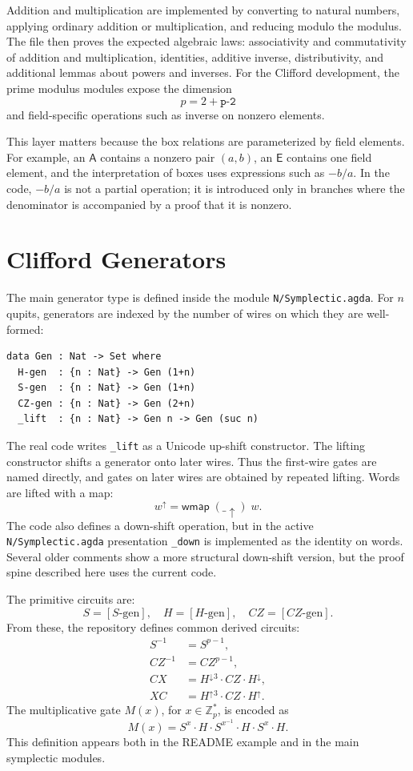 \documentclass[sigplan,screen,review,anonymous]{acmart}
\newcommand{\Zp}{\mathbb{Z}_p}
\newcommand{\ABox}{\mathsf{A}}
\newcommand{\EBox}{\mathsf{E}}
\newcommand{\file}[1]{\texttt{#1}}
\begin{document}
Addition and multiplication are implemented by converting to natural
numbers, applying ordinary addition or multiplication, and reducing
modulo the modulus.  The file then proves the expected algebraic laws:
associativity and commutativity of addition and multiplication,
identities, additive inverse, distributivity, and additional lemmas
about powers and inverses.  For the Clifford development, the prime
modulus modules expose the dimension
\[
  p = 2 + \texttt{p-2}
\]
and field-specific operations such as inverse on nonzero elements.

This layer matters because the box relations are parameterized by
field elements.  For example, an \(\ABox\) contains a nonzero pair
\((a,b)\), an \(\EBox\) contains one field element, and the
interpretation of boxes uses expressions such as \(-b/a\).  In the
code, \(-b/a\) is not a partial operation; it is introduced only in
branches where the denominator is accompanied by a proof that it is
nonzero.

\section{Clifford Generators}

The main generator type is defined inside the module
\file{N/Symplectic.agda}.  For \(n\) qupits, generators are indexed by
the number of wires on which they are well-formed:

\begin{lstlisting}
data Gen : Nat -> Set where
  H-gen  : {n : Nat} -> Gen (1+n)
  S-gen  : {n : Nat} -> Gen (1+n)
  CZ-gen : {n : Nat} -> Gen (2+n)
  _lift  : {n : Nat} -> Gen n -> Gen (suc n)
\end{lstlisting}

The real code writes \texttt{\_lift} as a Unicode up-shift
constructor.  The lifting constructor shifts a generator onto later
wires.  Thus the first-wire gates are named directly, and gates on
later wires are obtained by repeated lifting.  Words are lifted with a
map:
\[
  w^\uparrow = \mathsf{wmap}\;(\_\!\uparrow)\;w.
\]
The code also defines a down-shift operation, but in the active
\file{N/Symplectic.agda} presentation \texttt{\_down} is implemented
as the identity on words.  Several older comments show a more
structural down-shift version, but the proof spine described here
uses the current code.

The primitive circuits are:
\[
S = [S\text{-gen}],\quad
H = [H\text{-gen}],\quad
CZ = [CZ\text{-gen}].
\]
From these, the repository defines common derived circuits:
\[
\begin{aligned}
S^{-1} &= S^{p-1},\\
CZ^{-1} &= CZ^{p-1},\\
CX &= H^\downarrow{}^3 \cdot CZ \cdot H^\downarrow,\\
XC &= H^\uparrow{}^3 \cdot CZ \cdot H^\uparrow.
\end{aligned}
\]
The multiplicative gate \(M(x)\), for \(x \in \Zp^\ast\), is encoded
as
\[
  M(x) = S^x \cdot H \cdot S^{x^{-1}} \cdot H \cdot S^x \cdot H.
\]
This definition appears both in the README example and in the main
symplectic modules.
\end{document}
